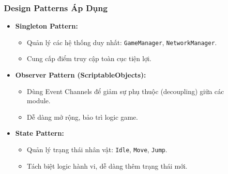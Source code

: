 \begin{frame}
\frametitle{Design Patterns Áp Dụng}
\begin{itemize}
    \item \textbf{Singleton Pattern:}
    \begin{itemize}
        \item Quản lý các hệ thống duy nhất: \texttt{GameManager}, \texttt{NetworkManager}.
        \item Cung cấp điểm truy cập toàn cục tiện lợi.
    \end{itemize}
    
    \item \textbf{Observer Pattern (ScriptableObjects):}
    \begin{itemize}
        \item Dùng Event Channels để giảm sự phụ thuộc (decoupling) giữa các module.
        \item Dễ dàng mở rộng, bảo trì logic game.
    \end{itemize}
    
    \item \textbf{State Pattern:}
    \begin{itemize}
        \item Quản lý trạng thái nhân vật: \texttt{Idle}, \texttt{Move}, \texttt{Jump}.
        \item Tách biệt logic hành vi, dễ dàng thêm trạng thái mới.
    \end{itemize}
\end{itemize}
\end{frame}